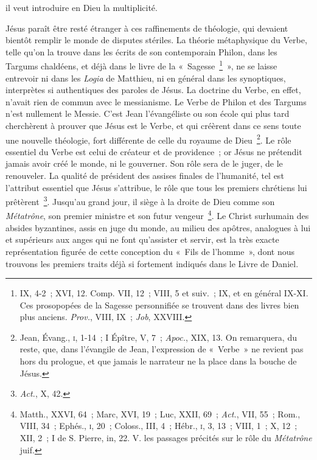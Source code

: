 \documentclass[french,twoside]{book} %
\begin{document}
il veut introduire en Dieu la multiplicité.\par
Jésus paraît être resté étranger à ces raffinements de théologie, qui devaient bientôt remplir le monde de disputes stériles. La théorie métaphysique du Verbe, telle qu’on la trouve dans les écrits de son contemporain Philon, dans les Targums chaldéens, et déjà dans le livre de la « Sagesse \footnote{ IX, 4-2 ; XVI, 12. Comp. VII, 12 ; VIII, 5 et suiv. ; IX, et en général IX-XI. Ces prosopopées de la Sagesse personnifiée se trouvent dans des livres bien plus anciens. {\itshape Prov.}, VIII, IX ; {\itshape Job}, XXVIII.} », ne se laisse entrevoir ni dans les {\itshape Logia} de Matthieu, ni en général dans les synoptiques, interprètes si authentiques des paroles de Jésus. La doctrine du Verbe, en effet, n’avait rien de commun avec le messianisme. Le Verbe de Philon et des Targums n’est nullement le Messie. C’est Jean l’évangéliste ou son école qui plus tard cherchèrent à prouver que Jésus est le Verbe, et qui créèrent dans ce sens toute une nouvelle théologie, fort différente de celle du royaume de Dieu \footnote{ Jean, Évang., \textsc{i}, 1-14 ; I Épître, V, 7 ; {\itshape Apoc.}, XIX, 13. On remarquera, du reste, que, dans l’évangile de Jean, l’expression de « Verbe » ne revient pas hors du prologue, et que jamais le narrateur ne la place dans la bouche de Jésus.}. Le rôle essentiel du Verbe est celui de créateur et de providence ; or Jésus ne prétendit jamais avoir créé le monde, ni le gouverner. Son rôle sera de le juger, de le renouveler. La qualité de président des assises finales de l’humanité, tel est l’attribut essentiel que Jésus s’attribue, le rôle que tous les premiers chrétiens lui prêtèrent \footnote{{\itshape Act.}, X, 42.}. Jusqu’au grand jour, il siège à la droite de Dieu comme son {\itshape Métatrône}, son premier ministre et son futur vengeur \footnote{ Matth., XXVI, 64 ; Marc, XVI, 19 ; Luc, XXII, 69 ; {\itshape Act.}, VII, 55 ; Rom., VIII, 34 ; Ephés., \textsc{i}, 20 ; Coloss., III, 4 ; Hébr., \textsc{i}, 3, 13 ; VIII, 1 ; X, 12 ; XII, 2 ; I de S. Pierre, in, 22. V. les passages précités sur le rôle du {\itshape Métatrône} juif.}. Le Christ surhumain des absides byzantines, assis en juge du monde, au milieu des apôtres, analogues à lui et supérieurs aux anges qui ne font qu’assister et servir, est la très exacte représentation figurée de cette conception du « Fils de l’homme », dont nous trouvons les premiers traits déjà si fortement indiqués dans le Livre de Daniel.\par
\end{document}
